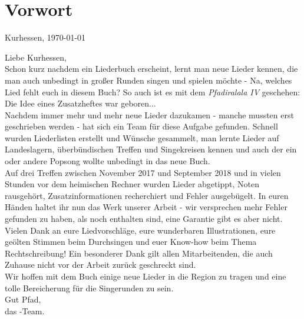 \section*{Vorwort}

\begin{flushright} 
    Kurhessen, \today
\end{flushright}

Liebe Kurhessen, \\ 

Schon kurz nachdem ein Liederbuch erscheint, lernt man neue Lieder kennen, die man auch unbedingt in großer Runden singen und spielen möchte - Na, welches Lied fehlt euch in diesem Buch? So auch ist es mit dem \emph{Pfadiralala IV} geschehen: Die Idee eines Zusatzheftes war geboren... \\

Nachdem immer mehr und mehr neue Lieder dazukamen - manche mussten erst geschrieben werden - hat sich ein Team für diese Aufgabe gefunden. Schnell wurden Liederlisten erstellt und Wünsche gesammelt, man lernte Lieder auf Landeslagern, überbündischen Treffen und Singekreisen kennen und auch der ein oder andere Popsong wollte unbedingt in das neue Buch. \\

Auf drei Treffen zwischen November 2017 und September 2018 und in vielen Stunden vor dem heimischen Rechner wurden Lieder abgetippt, Noten rausgehört, Zusatzinformationen recherchiert und Fehler ausgebügelt. In euren Händen haltet ihr nun das Werk unserer Arbeit - wir versprechen mehr Fehler gefunden zu haben, als noch enthalten sind, eine Garantie gibt es aber nicht. \\

Vielen Dank an eure Liedvorschläge, eure wunderbaren Illustrationen, eure geölten Stimmen beim Durchsingen und euer Know-how beim Thema Rechtschreibung! Ein besonderer Dank gilt allen Mitarbeitenden, die auch Zuhause nicht vor der Arbeit zurück geschreckt sind. \\

Wir hoffen mit dem Buch einige neue Lieder in die Region zu tragen und eine tolle Bereicherung für die Singerunden zu sein. \\

Gut Pfad, \\
das \bookname{}-Team.
